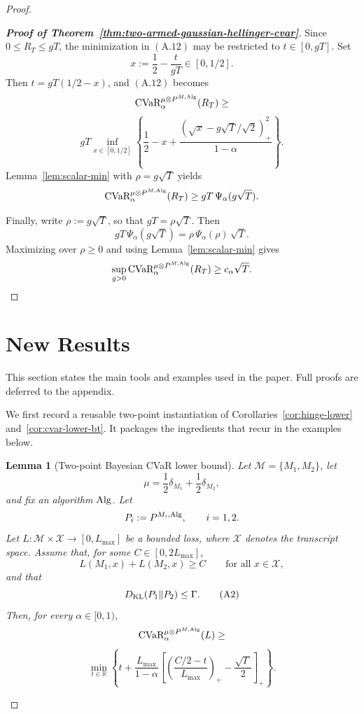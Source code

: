 \documentclass[conference]{IEEEtran}
\newtheorem{lemma}{Lemma}
\begin{document}
\begin{proof}[Proof]
\begin{proof}[\textbf{Proof of Theorem~\ref{thm:two-armed-gaussian-hellinger-cvar}}]
\medskip
\noindent
{}
Since \(0\le R_T\le gT\), the minimization in \((\mathrm{A.12})\) may be restricted to \(t\in[0,gT]\). Set
\[
x:=\frac12-\frac{t}{gT}\in[0,1/2].
\]
Then \(t=gT(1/2-x)\), and \((\mathrm{A.12})\) becomes
\[
\textup{CVaR}_\alpha^{\mu\otimes P^{M,\textup{Alg}}}(R_T)
\ge\]
\[
gT
\inf_{x\in[0,1/2]}
\left\{
\frac12-x+\frac{(\sqrt{x}-g\sqrt{T}/\sqrt2)_+^2}{1-\alpha}
\right\}.
\]
Lemma~\ref{lem:scalar-min} with \(\rho=g\sqrt T\) yields
\[
\textup{CVaR}_\alpha^{\mu\otimes P^{M,\textup{Alg}}}(R_T)
\ge
gT\,\Psi_\alpha(g\sqrt T).
\]

Finally, write \(\rho:=g\sqrt T\), so that \(gT=\rho\sqrt T\). Then
\[
gT\,\Psi_\alpha(g\sqrt T)=\rho\,\Psi_\alpha(\rho)\,\sqrt T.
\]
Maximizing over \(\rho\ge 0\) and using Lemma~\ref{lem:scalar-min} gives
\[
\sup_{g>0}
\textup{CVaR}_\alpha^{\mu\otimes P^{M,\textup{Alg}}}(R_T)
\ge
c_\alpha\sqrt T.
\]
\end{proof}



\iffalse
\section{New Results}

This section states the main tools and examples used in the paper. Full proofs are deferred to the appendix.

We first record a reusable two-point instantiation of Corollaries~\ref{cor:hinge-lower} and~\ref{cor:cvar-lower-bt}. It packages the ingredients that recur in the examples below.

\begin{lemma}[Two-point Bayesian \textup{CVaR} lower bound]
\label{lem:two-point-cvar}
Let \(\mathcal{M}=\{M_1,M_2\}\), let
\[
\mu=\frac12\delta_{M_1}+\frac12\delta_{M_2},
\]
and fix an algorithm \(\textup{Alg}\). Let
\[
P_i:=P^{M_i,\textup{Alg}},\qquad i=1,2.
\]
Let \(L:\mathcal{M}\times \mathcal{X}\to [0,L_{\max}]\) be a bounded loss, where \(\mathcal{X}\) denotes the transcript space. Assume that, for some \(C\in[0,2L_{\max}]\),
\[
L(M_1,x)+L(M_2,x)\ge C
\qquad
\text{for all }x\in\mathcal{X},
\tag{A1}
\]
and that
\[
D_{\textup{KL}}(P_1\|P_2)\le \Gamma.
\tag{A2}
\]
Then, for every \(\alpha\in[0,1)\),
\[
\textup{CVaR}_\alpha^{\mu\otimes P^{M,\textup{Alg}}}(L)
\ge\]
\[
\min_{t\in\mathbb{R}}
\left\{
t+\frac{L_{\max}}{1-\alpha}
\left[
\left(\frac{C/2-t}{L_{\max}}\right)_+
-\frac{\sqrt{\Gamma}}{2}
\right]_+
\right\}.
\]
\end{lemma}


\end{proof}
\end{document}
